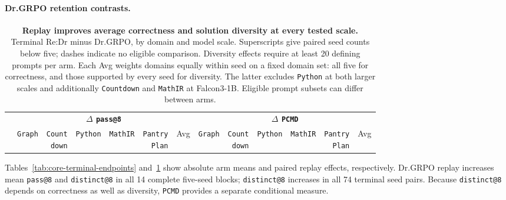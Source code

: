 \documentclass{article}
\makeatletter
\newcommand{\1}{\mathbf 1}
\newcommand{\pmd}{\texttt{PCMD}}
\newcommand{\distk}{\texttt{distinct@8}}
\theoremstyle{remark}
\theoremstyle{definition}
\theoremstyle{plain}
\makeatother
\begin{document}
\crossscaletablematerial

\paragraph{Dr.GRPO retention contrasts.}
\label{app:retention-numerical-detail}

\begin{table}[!tbp]
  \centering
  \caption{\textbf{Replay improves average correctness and solution diversity at every tested scale.}
  Terminal Re:Dr minus Dr.GRPO, by domain and model scale. Superscripts give
  paired seed counts below five; dashes indicate no eligible comparison.
  Diversity effects require at least 20 defining prompts per arm. Each Avg
  weights domains equally within seed on a fixed domain set: all five for
  correctness, and those supported by every seed for diversity. The latter
  excludes \texttt{Python} at both larger scales and additionally \texttt{Countdown} and \texttt{MathIR}
  at Falcon3-1B. Eligible prompt subsets can differ between arms.}

\label{tab:cross-scale-terminal-effects}
  \scriptsize
  \setlength{\tabcolsep}{1.4pt}
  \renewcommand{\arraystretch}{0.92}
  \begin{tabular}{@{}l*{12}{r}@{}}
    \toprule
    & \multicolumn{6}{c}{\textbf{$\Delta$ \texttt{pass@8}}}
      & \multicolumn{6}{c}{\textbf{$\Delta$ \pmd{}}} \\
    \cmidrule(lr){2-7}\cmidrule(l){8-13}
    & \texttt{Graph} & \shortstack{\texttt{Count}\\\texttt{down}} & \texttt{Python} & \texttt{MathIR} & \shortstack{\texttt{Pantry}\\\texttt{Plan}} & Avg
      & \texttt{Graph} & \shortstack{\texttt{Count}\\\texttt{down}} & \texttt{Python} & \texttt{MathIR} & \shortstack{\texttt{Pantry}\\\texttt{Plan}} & Avg \\
    \midrule
    
  \end{tabular}
\end{table}

Tables~\ref{tab:core-terminal-endpoints} and~\ref{tab:cross-scale-terminal-effects}
show absolute arm means and paired replay effects, respectively. Dr.GRPO
replay increases mean \texttt{pass@8} and \distk{} in all 14 complete
five-seed blocks; \distk{} increases in all 74 terminal seed pairs.
Because \distk{} depends on correctness as well as diversity, \pmd{} provides
a separate conditional measure.
\end{document}
